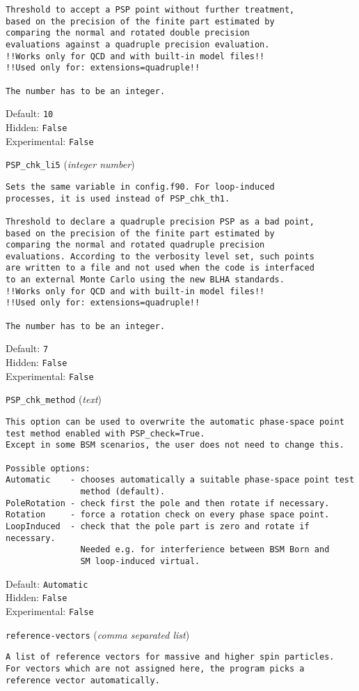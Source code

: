 \begin{basedescript}{\desclabelstyle{\pushlabel}}
\begin{verbatim}
Threshold to accept a PSP point without further treatment,
based on the precision of the finite part estimated by
comparing the normal and rotated double precision
evaluations against a quadruple precision evaluation.
!!Works only for QCD and with built-in model files!!
!!Used only for: extensions=quadruple!!

The number has to be an integer.
\end{verbatim}
Default: \verb|10|
\\Hidden: \verb|False|
\\Experimental: \verb|False|
\\\item[\colorbox{gray!30}{\texttt{PSP\_chk\_li5}}] (\textit{integer number})
\begin{verbatim}
Sets the same variable in config.f90. For loop-induced
processes, it is used instead of PSP_chk_th1.

Threshold to declare a quadruple precision PSP as a bad point,
based on the precision of the finite part estimated by
comparing the normal and rotated quadruple precision
evaluations. According to the verbosity level set, such points
are written to a file and not used when the code is interfaced
to an external Monte Carlo using the new BLHA standards.
!!Works only for QCD and with built-in model files!!
!!Used only for: extensions=quadruple!!

The number has to be an integer.
\end{verbatim}
Default: \verb|7|
\\Hidden: \verb|False|
\\Experimental: \verb|False|
\\\item[\colorbox{gray!30}{\texttt{PSP\_chk\_method}}] (\textit{text})
\begin{verbatim}
This option can be used to overwrite the automatic phase-space point
test method enabled with PSP_check=True.
Except in some BSM scenarios, the user does not need to change this.

Possible options:
Automatic    - chooses automatically a suitable phase-space point test
               method (default).
PoleRotation - check first the pole and then rotate if necessary.
Rotation     - force a rotation check on every phase space point.
LoopInduced  - check that the pole part is zero and rotate if necessary.
               Needed e.g. for interferience between BSM Born and
               SM loop-induced virtual.
\end{verbatim}
Default: \verb|Automatic|
\\Hidden: \verb|False|
\\Experimental: \verb|False|
\\\item[\colorbox{gray!30}{\texttt{reference-vectors}}] (\textit{comma separated list})
\begin{verbatim}
A list of reference vectors for massive and higher spin particles.
For vectors which are not assigned here, the program picks a
reference vector automatically.


\end{verbatim}
\end{basedescript}
